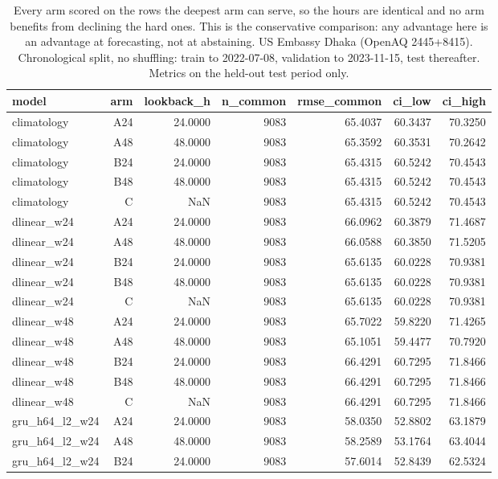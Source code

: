 \begin{table}[htbp]
\caption{Every arm scored on the rows the deepest arm can serve, so the hours are identical and no arm benefits from declining the hard ones. This is the conservative comparison: any advantage here is an advantage at forecasting, not at abstaining. US Embassy Dhaka (OpenAQ 2445+8415). Chronological split, no shuffling: train to 2022-07-08, validation to 2023-11-15, test thereafter. Metrics on the held-out test period only.}
\label{tab:lookback_common_subset}
\begin{tabular}{lrrrrrr}
\toprule
model & arm & lookback\_h & n\_common & rmse\_common & ci\_low & ci\_high \\
\midrule
climatology & A24 & 24.0000 & 9083 & 65.4037 & 60.3437 & 70.3250 \\
climatology & A48 & 48.0000 & 9083 & 65.3592 & 60.3531 & 70.2642 \\
climatology & B24 & 24.0000 & 9083 & 65.4315 & 60.5242 & 70.4543 \\
climatology & B48 & 48.0000 & 9083 & 65.4315 & 60.5242 & 70.4543 \\
climatology & C & NaN & 9083 & 65.4315 & 60.5242 & 70.4543 \\
dlinear\_w24 & A24 & 24.0000 & 9083 & 66.0962 & 60.3879 & 71.4687 \\
dlinear\_w24 & A48 & 48.0000 & 9083 & 66.0588 & 60.3850 & 71.5205 \\
dlinear\_w24 & B24 & 24.0000 & 9083 & 65.6135 & 60.0228 & 70.9381 \\
dlinear\_w24 & B48 & 48.0000 & 9083 & 65.6135 & 60.0228 & 70.9381 \\
dlinear\_w24 & C & NaN & 9083 & 65.6135 & 60.0228 & 70.9381 \\
dlinear\_w48 & A24 & 24.0000 & 9083 & 65.7022 & 59.8220 & 71.4265 \\
dlinear\_w48 & A48 & 48.0000 & 9083 & 65.1051 & 59.4477 & 70.7920 \\
dlinear\_w48 & B24 & 24.0000 & 9083 & 66.4291 & 60.7295 & 71.8466 \\
dlinear\_w48 & B48 & 48.0000 & 9083 & 66.4291 & 60.7295 & 71.8466 \\
dlinear\_w48 & C & NaN & 9083 & 66.4291 & 60.7295 & 71.8466 \\
gru\_h64\_l2\_w24 & A24 & 24.0000 & 9083 & 58.0350 & 52.8802 & 63.1879 \\
gru\_h64\_l2\_w24 & A48 & 48.0000 & 9083 & 58.2589 & 53.1764 & 63.4044 \\
gru\_h64\_l2\_w24 & B24 & 24.0000 & 9083 & 57.6014 & 52.8439 & 62.5324 \\

\end{tabular}
\end{table}
